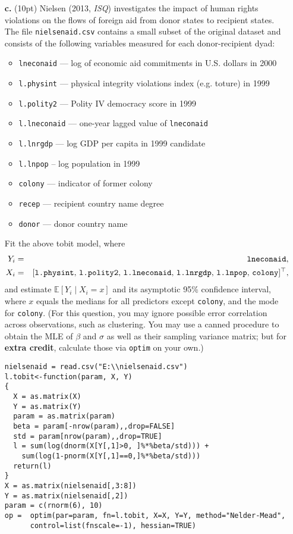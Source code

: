 \documentclass[11pt,english]{article}
\newcommand{\E}{\mathbb{E}}
\newcommand{\spacingset}[1]{\renewcommand{\baselinestretch}%
{#1}\small\normalsize}
\begin{document}
\begin{itemize}
\item[{\bf c.}] (10pt) Nielsen (2013, {\it ISQ}) investigates the impact of human rights violations on the flows of foreign aid from donor states to recipient states. The file {\tt nielsenaid.csv} contains a small subset of the original dataset and consists of the following variables measured for each donor-recipient dyad:
{
\spacingset{1}
\begin{itemize}
\item \texttt{lneconaid} --- log of economic aid commitments in U.S. dollars in 2000
\item \texttt{l.physint} ---  physical integrity violations index (e.g. toture) in 1999
\item \texttt{l.polity2} --- Polity IV democracy score in 1999
\item \texttt{l.lneconaid} --- one-year lagged value of {\tt lneconaid}
\item \texttt{l.lnrgdp} --- log GDP per capita in 1999
candidate
\item \texttt{l.lnpop} -- log population in 1999
\item \texttt{colony} --- indicator of former colony
\item \texttt{recep} --- recipient country name
degree
\item \texttt{donor} --- donor country name
\end{itemize}
}

Fit the above tobit model, where
\begin{eqnarray*}
Y_i & = & {\tt lneconaid}, \\
X_i & = & [\text{{\tt l.physint}, {\tt l.polity2}, {\tt l.lneconaid}, {\tt l.lnrgdp}, {\tt l.lnpop}, {\tt colony}}]^\top,
\end{eqnarray*}
and estimate $\E[Y_i \mid X_i=x]$ and its asymptotic 95\% confidence interval, where $x$ equals the medians for all predictors except {\tt colony}, and the mode for {\tt colony}. (For this question, you may ignore possible error correlation across observations, such as clustering. You may use a canned procedure to obtain the MLE of $\beta$ and $\sigma$ as well as their sampling variance matrix; but for {\bf extra credit}, calculate those via {\tt optim} on your own.)

\begin{verbatim}
nielsenaid = read.csv("E:\\nielsenaid.csv")
l.tobit<-function(param, X, Y)
{
  X = as.matrix(X)
  Y = as.matrix(Y)
  param = as.matrix(param)
  beta = param[-nrow(param),,drop=FALSE]
  std = param[nrow(param),,drop=TRUE]
  l = sum(log(dnorm(X[Y[,1]>0, ]%*%beta/std))) +
    sum(log(1-pnorm(X[Y[,1]==0,]%*%beta/std)))
  return(l)
}
X = as.matrix(nielsenaid[,3:8])
Y = as.matrix(nielsenaid[,2])
param = c(rnorm(6), 10)
op =  optim(par=param, fn=l.tobit, X=X, Y=Y, method="Nelder-Mead",
      control=list(fnscale=-1), hessian=TRUE)



\end{verbatim}
\end{itemize}
\end{document}
